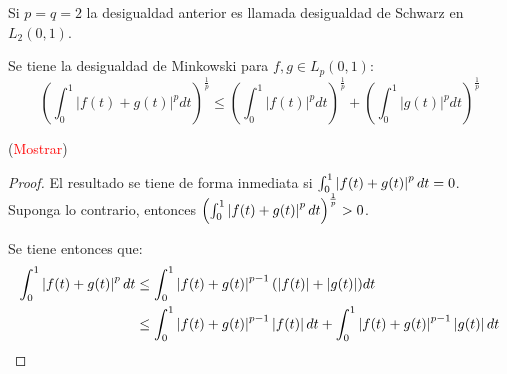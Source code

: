 \documentclass[twoside,12pt,a4 paper,openright]{book}
\begin{document}
\begin{enumerate}
    Si $p=q=2$ la desigualdad anterior es llamada desigualdad de Schwarz en $L_2(0,1)$.

    Se tiene la desigualdad de Minkowski para $f,g\in L_p(0,1)$: 
    \begin{equation*}
        \left(\int_0^1 |f(t) + g(t)|^p dt \right)^{\frac{1}{p}}\leq   \left(  \int_0^1 |f(t)|^p dt\right) ^{\frac{1}{p}} + \left(  \int_0^1 |g(t)|^p dt\right) ^{\frac{1}{p}}
    \end{equation*}

    (\textcolor{red}{Mostrar})

    \begin{proof}
        El resultado se tiene de forma inmediata si $\int_{0}^{1}\left|f(t)+g(t)\right|^pdt=0$. Suponga lo contrario, entonces $\left(\int_{0}^{1}\left|f(t)+g(t)\right|^pdt \right)^{\frac{1}{p}}>0$. 
        
        Se tiene entonces que:
        \begin{equation*}
            \begin{split}
                \int_{0}^{1}\left|f(t)+g(t)\right|^pdt&\leq\int_{0}^{1}\left|f(t)+g(t)\right|^{p-1}(\left|f(t)\right|+\left|g(t)\right|)dt\\
                &\leq\int_{0}^{1}\left|f(t)+g(t)\right|^{p-1}\left|f(t)\right|dt+\int_{0}^{1}\left|f(t)+g(t)\right|^{p-1}\left|g(t)\right|dt\\
            \end{split}
        \end{equation*}


\end{proof}
\end{enumerate}
\end{document}
